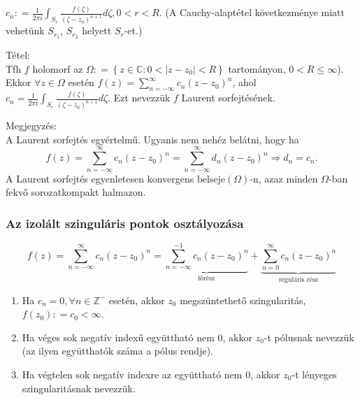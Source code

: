 \documentclass[12pt,a4paper]{scrartcl}
\providecommand{\tightlist}{%
  \setlength{\itemsep}{0pt}\setlength{\parskip}{0pt}}
\newenvironment{tetel}{}{}
\newenvironment{megjegyzes}{}{}
\begin{document}
\(c_{n}: = \frac{1}{2\pi i}{\int_{S_{r}}{\frac{f\left( \zeta \right)}{\left( {\zeta - z_{0}} \right)^{n + 1}}d\zeta}},0 < r < R\).
(A Cauchy-alaptétel következménye miatt vehetünk \(S_{r_{1}}\),
\(S_{r_{2}}\) helyett \(S_{r}\)-et.)

\begin{tetel}

Tétel:\\
Tfh \(f\) holomorf az
\(\Omega: = \left\{ {z \in {\mathbb{C}}:0 < \left| {z - z_{0}} \right| < R} \right\}\)
tartományon, \(0 < R \leq \infty\)). Ekkor \(\forall z \in \Omega\)
esetén
\(f\left( z \right) = {\sum\limits_{n = - \infty}^{\infty}{c_{n}\left( {z - z_{0}} \right)^{n}}}\),
ahol
\(c_{n} = \frac{1}{2\pi i}{\int_{S_{r}}{\frac{f\left( \zeta \right)}{\left( {\zeta - z_{0}} \right)^{n + 1}}d\zeta}}\).
Ezt nevezzük \(f\) Laurent sorfejtésének.

\end{tetel}

\begin{megjegyzes}

Megjegyzés:\\
A Laurent sorfejtés egyértelmű. Ugyanis nem nehéz belátni, hogy ha
\[\left. f\left( z \right) = {\sum\limits_{n = - \infty}^{\infty}{c_{n}\left( {z - z_{0}} \right)^{n}}} = {\sum\limits_{n = - \infty}^{\infty}{d_{n}\left( {z - z_{0}} \right)^{n}}}\Rightarrow d_{n} = c_{n}. \right.\]A
Laurent sorfejtés egyenletesen konvergens
\(\text{belseje}\left( \Omega \right)\)-n, azaz minden \(\Omega\)-ban
fekvő sorozatkompakt halmazon.

\end{megjegyzes}

\hypertarget{az-izolalt-szingularis-pontok-osztalyozasa}{%
\subsubsection{Az izolált szinguláris pontok
osztályozása}\label{az-izolalt-szingularis-pontok-osztalyozasa}}

\[f\left( z \right) = \mathop \sum \limits_{n =  - \infty }^\infty  {c_n}{\left( {z - {z_0}} \right)^n} = \underbrace {\sum\limits_{n =  - \infty }^{ - 1} {{c_n}{{\left( {z - {z_0}} \right)}^n}} }_{{\text{főrész}}} + \underbrace {\sum\limits_{n = 0}^\infty  {{c_n}{{\left( {z - {z_0}} \right)}^n}} }_{{\text{reguláris rész}}}\]

\begin{enumerate}
\def\labelenumi{\arabic{enumi}.}
\tightlist
\item
  Ha \(c_{n} = 0,\forall n \in {\mathbb{Z}}^{-}\) esetén, akkor
  \(z_{0}\) megszüntethető szingularitás,
  \(f\left( z_{0} \right): = c_{0} < \infty\).
\item
  Ha véges sok negatív indexű együttható nem 0, akkor \(z_{0}\)-t
  pólusnak nevezzük (az ilyen együtthatók száma a pólus rendje).
\item
  Ha végtelen sok negatív indexre az együttható nem 0, akkor \(z_{0}\)-t
  lényeges szingularitásnak nevezzük.
\end{enumerate}
\end{document}

